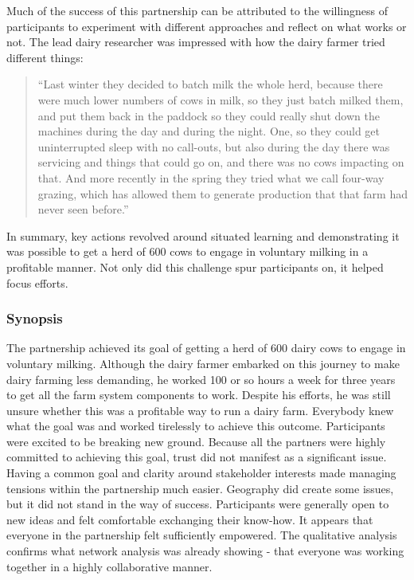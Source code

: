 Much of the success of this partnership can be attributed to the willingness of participants to experiment with different approaches and reflect on what works or not. The lead dairy researcher was impressed with how the dairy farmer tried different things:

\begin{quote}
\small
\enquote{Last winter they decided to batch milk the whole herd, because there were much lower numbers of cows in milk, so they just batch milked them, and put them back in the paddock so they could really shut down the machines during the day and during the night. One, so they could get uninterrupted sleep with no call-outs, but also during the day there was servicing and things that could go on, and there was no cows impacting on that. And more recently in the spring they tried what we call four-way grazing, which has allowed them to generate production that that farm had never seen before.} \\
\end{quote}

In summary, key actions revolved around situated learning and demonstrating it was possible to get a herd of 600 cows to engage in voluntary milking in a profitable manner. Not only did this challenge spur participants on, it helped focus efforts. 

\subsubsection{Synopsis}

The partnership achieved its goal of getting a herd of 600 dairy cows to engage in voluntary milking. Although the dairy farmer embarked on this journey to make dairy farming less demanding, he worked 100 or so hours a week for three years to get all the farm system components to work. Despite his efforts, he was still unsure whether this was a profitable way to run a dairy farm. Everybody knew what the goal was and worked tirelessly to achieve this outcome. Participants were excited to be breaking new ground. Because all the partners were highly committed to achieving this goal, trust did not manifest as a significant issue. Having a common goal and clarity around stakeholder interests made managing tensions within the partnership much easier. Geography did create some issues, but it did not stand in the way of success. Participants were generally open to new ideas and felt comfortable exchanging their know-how. It appears that everyone in the partnership felt sufficiently empowered. The qualitative analysis confirms what network analysis was already showing - that everyone was working together in a highly collaborative manner. 

